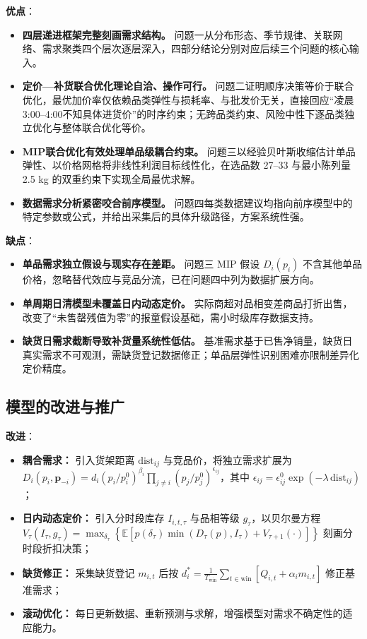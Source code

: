 \textbf{优点}：
\begin{itemize}
    \item \textbf{四层递进框架完整刻画需求结构。} 问题一从分布形态、季节规律、关联网络、需求聚类四个层次逐层深入，四部分结论分别对应后续三个问题的核心输入。
    \item \textbf{定价—补货联合优化理论自洽、操作可行。} 问题二证明顺序决策等价于联合优化，最优加价率仅依赖品类弹性与损耗率、与批发价无关，直接回应“凌晨3:00--4:00不知具体进货价”的时序约束；无跨品类约束、风险中性下逐品类独立优化与整体联合优化等价。
    \item \textbf{MIP联合优化有效处理单品级耦合约束。} 问题三以经验贝叶斯收缩估计单品弹性、以价格网格将非线性利润目标线性化，在选品数 27--33 与最小陈列量 2.5 kg 的双重约束下实现全局最优求解。
    \item \textbf{数据需求分析紧密咬合前序模型。} 问题四每类数据建议均指向前序模型中的特定参数或公式，并给出采集后的具体升级路径，方案系统性强。
\end{itemize}

\textbf{缺点}：
\begin{itemize}
    \item \textbf{单品需求独立假设与现实存在差距。} 问题三 MIP 假设 $D_i(p_i)$ 不含其他单品价格，忽略替代效应与竞品分流，已在问题四中列为数据扩展方向。
    \item \textbf{单周期日清模型未覆盖日内动态定价。} 实际商超对品相变差商品打折出售，改变了“未售罄残值为零”的报童假设基础，需小时级库存数据支持。
    \item \textbf{缺货日需求截断导致补货量系统性低估。} 基准需求基于已售净销量，缺货日真实需求不可观测，需缺货登记数据修正；单品层弹性识别困难亦限制差异化定价精度。
\end{itemize}

\subsection{模型的改进与推广}

\textbf{改进}：
\begin{itemize}
    \item \textbf{耦合需求：} 引入货架距离 $\mathrm{dist}_{ij}$ 与竞品价，将独立需求扩展为 $D_i(p_i,\mathbf{p}_{-i})=d_i(p_i/p_i^0)^{\beta_i}\prod_{j\ne i}(p_j/p_j^0)^{\epsilon_{ij}}$，其中 $\epsilon_{ij}=\epsilon_{ij}^0\exp(-\lambda\,\mathrm{dist}_{ij})$；
    \item \textbf{日内动态定价：} 引入分时段库存 $I_{i,t,\tau}$ 与品相等级 $g_\tau$，以贝尔曼方程 $V_\tau(I_\tau,g_\tau)=\max_{\delta_\tau}\left\{\mathbb{E}\left[p(\delta_\tau)\min(D_\tau(p),I_\tau)+V_{\tau+1}(\cdot)\right]\right\}$ 刻画分时段折扣决策；
    \item \textbf{缺货修正：} 采集缺货登记 $m_{i,t}$ 后按 $d_i^*=\frac{1}{T_{\mathrm{win}}}\sum_{t\in\mathrm{win}}\left[Q_{i,t}+\alpha_i m_{i,t}\right]$ 修正基准需求；
    \item \textbf{滚动优化：} 每日更新数据、重新预测与求解，增强模型对需求不确定性的适应能力。
\end{itemize}

